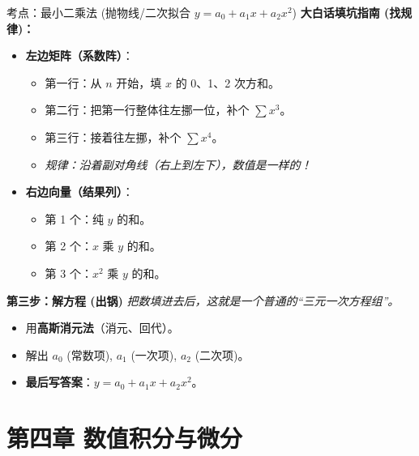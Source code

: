 \documentclass[12pt, a4paper]{article}
\begin{document}
\begin{knowpoint}{考点：最小二乘法 (抛物线/二次拟合 $y=a_0+a_1x+a_2x^2$)}
    \textbf{大白话填坑指南 (找规律)：}
    \begin{itemize}
        \item \textbf{左边矩阵（系数阵）}：
            \begin{itemize}
                \item 第一行：从 $n$ 开始，填 $x$ 的 0、1、2 次方和。
                \item 第二行：把第一行整体往左挪一位，补个 $\sum x^3$。
                \item 第三行：接着往左挪，补个 $\sum x^4$。
                \item \textit{规律：沿着副对角线（右上到左下），数值是一样的！}
            \end{itemize}
        \item \textbf{右边向量（结果列）}：
            \begin{itemize}
                \item 第 1 个：纯 $y$ 的和。
                \item 第 2 个：$x$ 乘 $y$ 的和。
                \item 第 3 个：$x^2$ 乘 $y$ 的和。
            \end{itemize}
    \end{itemize}

    \vspace{1.0em}
    \textbf{第三步：解方程 (出锅)}
    \textit{把数填进去后，这就是一个普通的“三元一次方程组”。}
    \begin{itemize}
        \item 用\textbf{高斯消元法}（消元、回代）。
        \item 解出 $a_0$ (常数项), $a_1$ (一次项), $a_2$ (二次项)。
        \item \textbf{最后写答案}：$y = a_0 + a_1 x + a_2 x^2$。
    \end{itemize}

\end{knowpoint}

\section*{第四章 数值积分与微分}
\end{document}
